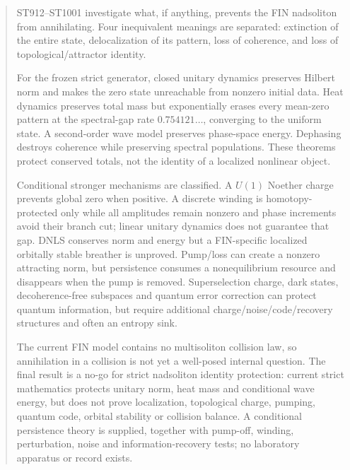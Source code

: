 \documentclass[11pt,a4paper]{article}
\begin{document}
\begin{abstract}
ST912--ST1001 investigate what, if anything, prevents the FIN nadsoliton from annihilating. Four inequivalent meanings are separated: extinction of the entire state, delocalization of its pattern, loss of coherence, and loss of topological/attractor identity.

For the frozen strict generator, closed unitary dynamics preserves Hilbert norm and makes the zero state unreachable from nonzero initial data. Heat dynamics preserves total mass but exponentially erases every mean-zero pattern at the spectral-gap rate $0.754121\ldots$, converging to the uniform state. A second-order wave model preserves phase-space energy. Dephasing destroys coherence while preserving spectral populations. These theorems protect conserved totals, not the identity of a localized nonlinear object.

Conditional stronger mechanisms are classified. A $U(1)$ Noether charge prevents global zero when positive. A discrete winding is homotopy-protected only while all amplitudes remain nonzero and phase increments avoid their branch cut; linear unitary dynamics does not guarantee that gap. DNLS conserves norm and energy but a FIN-specific localized orbitally stable breather is unproved. Pump/loss can create a nonzero attracting norm, but persistence consumes a nonequilibrium resource and disappears when the pump is removed. Superselection charge, dark states, decoherence-free subspaces and quantum error correction can protect quantum information, but require additional charge/noise/code/recovery structures and often an entropy sink.

The current FIN model contains no multisoliton collision law, so annihilation in a collision is not yet a well-posed internal question. The final result is a no-go for strict nadsoliton identity protection: current strict mathematics protects unitary norm, heat mass and conditional wave energy, but does not prove localization, topological charge, pumping, quantum code, orbital stability or collision balance. A conditional persistence theory is supplied, together with pump-off, winding, perturbation, noise and information-recovery tests; no laboratory apparatus or record exists.
\end{abstract}\tableofcontents\newpage
\end{document}
